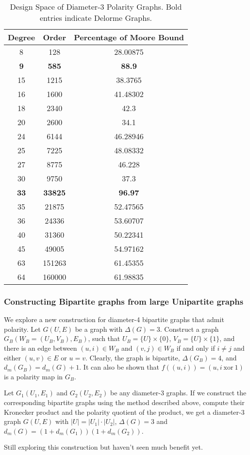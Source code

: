 \begin{table}[htbp]
\centering
\caption{Design Space of Diameter-3 Polarity Graphs. Bold entries indicate Delorme Graphs.}
\label{table:design_space}
\begin{tabular}{ccc}
\toprule
\textbf{Degree}                                & \textbf{Order} &
\textbf{Percentage of Moore Bound}\\ \midrule
8  & 128    & 28.00875 \\
\textbf{9}  & \textbf{585}    & \textbf{88.9}     \\
15 & 1215   & 38.3765  \\
16 & 1600   & 41.48302 \\
18 & 2340   & 42.3     \\
20 & 2600   & 34.1     \\
24 & 6144   & 46.28946 \\
25 & 7225   & 48.08332 \\
27 & 8775   & 46.228   \\
30 & 9750   & 37.3     \\
\textbf{33} & \textbf{33825}  & \textbf{96.97}    \\
35 & 21875  & 52.47565 \\
36 & 24336  & 53.60707 \\
40 & 31360  & 50.22341 \\
45 & 49005  & 54.97162 \\
63 & 151263 & 61.45355 \\
64 & 160000 & 61.98835\\
 \bottomrule
\end{tabular}
\end{table}


\subsubsection{Constructing Bipartite graphs from large Unipartite graphs}

We explore a new construction for diameter-4
bipartite graphs that admit 
polarity. Let $G(U,E)$ be a graph with $\Delta(G)=3$.
Construct a graph $G_B(W_B=(U_B,V_B),E_B)$, such that $U_B=\{U\}\times \{0\}$, $V_B=\{U\}\times \{1\}$, 
and there is an edge between $(u, i)\in W_B$ and $(v,j)\in W_B$ if and only if $i\neq j$ and either $(u,v)\in E$ or $u=v$.
Clearly, the graph is bipartite, $\Delta(G_B)=4$, and $d_{m}(G_B)=d_{m}(G)+1$.
It can also be shown that $f((u, i))=(u, i\ \text{xor}\ 1)$ is a polarity map in $G_B$.

Let $G_1(U_1,E_1)$ and
$G_2(U_2,E_2)$ be any diameter-3 graphs. If we 
construct the corresponding bipartite graphs using 
the method described above, 
compute their Kronecker product and the polarity
quotient of the product, we get a diameter-3 graph
$G(U,E)$ with $|U| = |U_1|\cdot |U_2|$, 
$\Delta(G)=3$ and $d_{m}(G)=(1+d_m(G_1))(1+d_m(G_2))$.

Still exploring this construction but haven't seen much
benefit yet.


